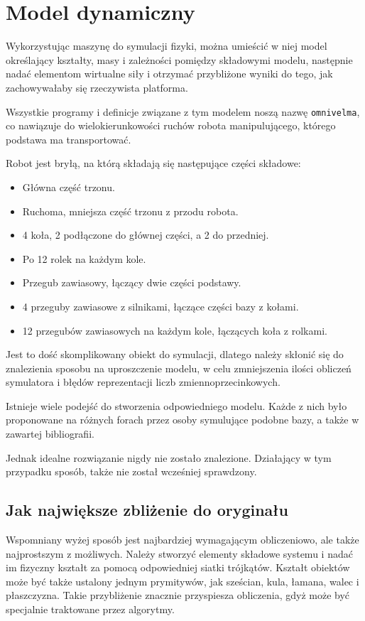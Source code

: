 \section{Model dynamiczny}
	\label{sec:omnivelma}
	Wykorzystując maszynę do symulacji fizyki, można umieścić w niej model określający kształty, masy i zależności pomiędzy składowymi modelu, 
	następnie nadać elementom wirtualne siły i otrzymać przybliżone wyniki do tego, jak zachowywałaby się rzeczywista platforma.

	Wszystkie programy i definicje związane z tym modelem noszą nazwę \texttt{omnivelma}, co nawiązuje do wielokierunkowości ruchów robota manipulującego, którego podstawa ma transportować.

	Robot jest bryłą, na którą składają się następujące części składowe:
	\begin{itemize}
	\item Główna część trzonu.
	\item Ruchoma, mniejsza część trzonu z przodu robota.
	\item 4 koła, 2 podłączone do głównej części, a 2 do przedniej.
	\item Po 12 rolek na każdym kole.
	\item Przegub zawiasowy, łączący dwie części podstawy.
	\item 4 przeguby zawiasowe z silnikami, łączące części bazy z kołami.
	\item 12 przegubów zawiasowych na każdym kole, łączących koła z rolkami.
	\end{itemize}

	Jest to dość skomplikowany obiekt do symulacji, dlatego należy skłonić się do znalezienia sposobu na uproszczenie modelu, w celu zmniejszenia ilości obliczeń symulatora
	i błędów reprezentacji liczb zmiennoprzecinkowych.

	Istnieje wiele podejść do stworzenia odpowiedniego modelu. Każde z nich było proponowane na różnych forach przez osoby symulujące podobne bazy, a także w zawartej bibliografii.
	
	Jednak idealne rozwiązanie nigdy nie zostało znalezione.
	Działający w tym przypadku sposób, także nie został wcześniej sprawdzony.

	\subsection{Jak największe zbliżenie do oryginału}
		Wspomniany wyżej sposób jest najbardziej wymagającym obliczeniowo, ale także najprostszym z możliwych.
		Należy stworzyć elementy składowe systemu i nadać im fizyczny kształt za pomocą odpowiedniej siatki trójkątów.
		Kształt obiektów może być także ustalony jednym prymitywów, jak sześcian, kula, łamana, walec i płaszczyzna.
		Takie przybliżenie znacznie przyspiesza obliczenia, gdyż może być specjalnie traktowane przez algorytmy.

